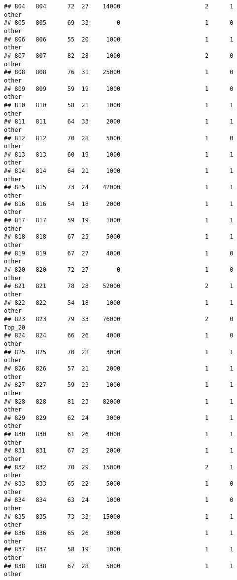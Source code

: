 \documentclass[
]{article}
\begin{document}
\begin{verbatim}
## 804   804      72  27    14000                        2      1    other
## 805   805      69  33        0                        1      0    other
## 806   806      55  20     1000                        1      1    other
## 807   807      82  28     1000                        2      0    other
## 808   808      76  31    25000                        1      0    other
## 809   809      59  19     1000                        1      0    other
## 810   810      58  21     1000                        1      1    other
## 811   811      64  33     2000                        1      1    other
## 812   812      70  28     5000                        1      0    other
## 813   813      60  19     1000                        1      1    other
## 814   814      64  21     1000                        1      1    other
## 815   815      73  24    42000                        1      1    other
## 816   816      54  18     2000                        1      1    other
## 817   817      59  19     1000                        1      1    other
## 818   818      67  25     5000                        1      1    other
## 819   819      67  27     4000                        1      0    other
## 820   820      72  27        0                        1      0    other
## 821   821      78  28    52000                        2      1    other
## 822   822      54  18     1000                        1      1    other
## 823   823      79  33    76000                        2      0   Top_20
## 824   824      66  26     4000                        1      0    other
## 825   825      70  28     3000                        1      1    other
## 826   826      57  21     2000                        1      1    other
## 827   827      59  23     1000                        1      1    other
## 828   828      81  23    82000                        1      1    other
## 829   829      62  24     3000                        1      1    other
## 830   830      61  26     4000                        1      1    other
## 831   831      67  29     2000                        1      1    other
## 832   832      70  29    15000                        2      1    other
## 833   833      65  22     5000                        1      0    other
## 834   834      63  24     1000                        1      0    other
## 835   835      73  33    15000                        1      1    other
## 836   836      65  26     3000                        1      1    other
## 837   837      58  19     1000                        1      1    other
## 838   838      67  28     5000                        1      1    other

\end{verbatim}
\end{document}
